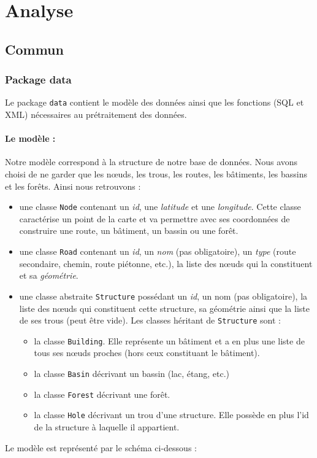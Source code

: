 \documentclass[12pt,a4paper,oneside]{article}
\begin{document}
\newpage

\tableofcontents
\newpage

\section{Analyse}

\subsection{Commun}

\subsubsection{Package data}
Le package \texttt{data} contient le modèle des données ainsi que les fonctions (SQL et XML) nécessaires au prétraitement des données.
\paragraph{Le modèle : \\}
Notre modèle correspond à la structure de notre base de données. Nous avons choisi de ne garder que les nœuds, les trous, les routes, les bâtiments, les bassins et les forêts. Ainsi nous retrouvons : \\
\renewcommand{\labelitemi}{$\bullet$}
\begin{itemize}
\item une classe \texttt{Node} contenant un \textit{id}, une \textit{latitude} et une \textit{longitude}. Cette classe caractérise un point de la carte et va permettre avec ses coordonnées de construire une route, un bâtiment, un bassin ou une forêt.
\item une classe \texttt{Road} contenant un \textit{id}, un \textit{nom} (pas obligatoire),  un \textit{type} (route secondaire, chemin, route piétonne, etc.), la liste des nœuds qui la constituent et sa \textit{géométrie}.
\item une classe abstraite \texttt{Structure} possédant un \textit{id}, un {nom} (pas obligatoire), la liste des nœuds qui constituent cette structure, sa géométrie ainsi que la liste de ses trous (peut être vide). Les classes héritant de \texttt{Structure} sont :
	\begin{itemize}
	\item la classe \texttt{Building}. Elle représente un bâtiment et a en plus une liste de tous ses nœuds proches (hors ceux constituant le bâtiment).
	\item la classe \texttt{Basin} décrivant un bassin (lac, étang, etc.)
	\item la classe \texttt{Forest} décrivant une forêt.
	\item la classe \texttt{Hole} décrivant un trou d'une structure. Elle possède en plus l'id de la structure à laquelle il appartient.
	\end{itemize}
\end{itemize}
Le modèle est représenté par le schéma ci-dessous :\\
\end{document}
